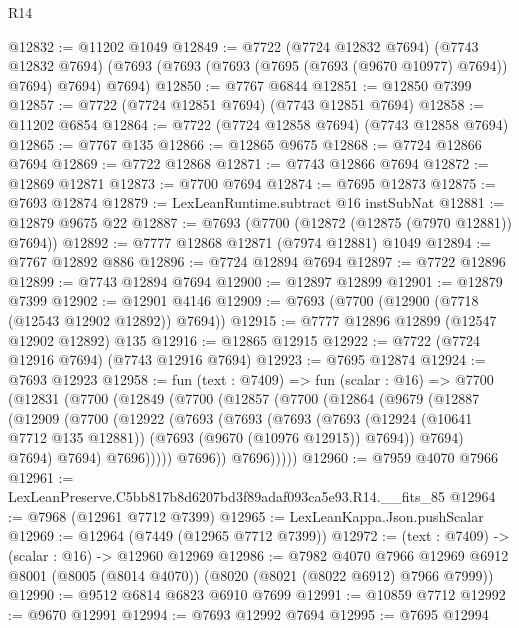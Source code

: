 \begin{lexlean}{R14}
\begin{coremodule}
@12832 := @11202 @1049
@12849 := @7722
    (@7724 @12832 @7694)
    (@7743 @12832 @7694)
    (@7693 (@7693 (@7693 (@7695 (@7693 (@9670 @10977) @7694)) @7694) @7694) @7694)
@12850 := @7767 @6844
@12851 := @12850 @7399
@12857 := @7722 (@7724 @12851 @7694) (@7743 @12851 @7694)
@12858 := @11202 @6854
@12864 := @7722 (@7724 @12858 @7694) (@7743 @12858 @7694)
@12865 := @7767 @135
@12866 := @12865 @9675
@12868 := @7724 @12866 @7694
@12869 := @7722 @12868
@12871 := @7743 @12866 @7694
@12872 := @12869 @12871
@12873 := @7700 @7694
@12874 := @7695 @12873
@12875 := @7693 @12874
@12879 := LexLeanRuntime.subtract @16 instSubNat
@12881 := @12879 @9675 @22
@12887 := @7693 (@7700 (@12872 (@12875 (@7970 @12881)) @7694))
@12892 := @7777 @12868 @12871 (@7974 @12881) @1049
@12894 := @7767 @12892 @886
@12896 := @7724 @12894 @7694
@12897 := @7722 @12896
@12899 := @7743 @12894 @7694
@12900 := @12897 @12899
@12901 := @12879 @7399
@12902 := @12901 @4146
@12909 := @7693 (@7700 (@12900 (@7718 (@12543 @12902 @12892)) @7694))
@12915 := @7777 @12896 @12899 (@12547 @12902 @12892) @135
@12916 := @12865 @12915
@12922 := @7722 (@7724 @12916 @7694) (@7743 @12916 @7694)
@12923 := @7695 @12874
@12924 := @7693 @12923
@12958 := fun (text : @7409) =>
  fun (scalar : @16) =>
  @7700
    (@12831
      (@7700
        (@12849
          (@7700
            (@12857
              (@7700
                (@12864
                  (@9679
                    (@12887
                      (@12909
                        (@7700
                          (@12922
                            (@7693
                              (@7693
                                (@7693
                                  (@7693
                                    (@12924 (@10641 @7712 @135 @12881))
                                    (@7693 (@9670 (@10976 @12915)) @7694))
                                  @7694)
                                @7694)
                              @7694)
                            @7696)))))
                  @7696))
              @7696)))))
@12960 := @7959 @4070 @7966
@12961 := LexLeanPreserve.C5bb817b8d6207bd3f89adaf093ca5e93.R14.__fits_85
@12964 := @7968 (@12961 @7712 @7399)
@12965 := LexLeanKappa.Json.pushScalar
@12969 := @12964 (@7449 (@12965 @7712 @7399))
@12972 := (text : @7409) -> (scalar : @16) -> @12960 @12969
@12986 := @7982
    @4070
    @7966
    @12969
    @6912
    @8001
    (@8005 (@8014 @4070))
    (@8020 (@8021 (@8022 @6912) @7966 @7999))
@12990 := @9512 @6814 @6823 @6910 @7699
@12991 := @10859 @7712
@12992 := @9670 @12991
@12994 := @7693 @12992 @7694
@12995 := @7695 @12994

\end{coremodule}
\end{lexlean}
